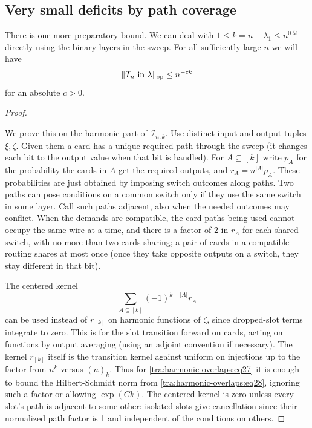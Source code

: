 \subsection{Very small deficits by path coverage}

\begin{lemma}\label{tra:harmonic-overlaps:very-sparse}

\label{tra:harmonic-overlaps:very-sparse-statement}
There is one more preparatory bound. We can deal with \(1\le k=n-\lambda_1\le n^{0.51}\) directly using the binary layers in the sweep. For all sufficiently large \(n\) we will have
\begin{equation}
                         \|T_n\text{ in }\lambda\|_{\rm op}
                                             \le n^{-c k}                 \label{tra:harmonic-overlaps:eq27}
\end{equation}
for an absolute \(c>0\).

\end{lemma}\begin{proof}\label{tra:harmonic-overlaps:very-sparse-proof}

\label{tra:harmonic-overlaps:path-coverage-forest-proof}
We prove this on the harmonic part of \(\mathcal I_{n,k}\). Use distinct input and output tuples \(\xi,\zeta\). Given them a card has a unique required path through the sweep (it changes each bit to the output value when that bit is handled). For \(A\subseteq[k]\) write \(p_A\) for the probability the cards in \(A\) get the required outputs, and \(r_A=n^{|A|}p_A\). These probabilities are just obtained by imposing switch outcomes along paths. Two paths can pose conditions on a common switch only if they use the same switch in some layer. Call such paths adjacent, also when the needed outcomes may conflict. When the demands are compatible, the card paths being used cannot occupy the same wire at a time, and there is a factor of 2 in \(r_A\) for each shared switch, with no more than two cards sharing; a pair of cards in a compatible routing shares at most once (once they take opposite outputs on a switch, they stay different in that bit).

The centered kernel
\begin{equation}
                       \sum_{A\subseteq[k]}(-1)^{k-|A|} r_A              \label{tra:harmonic-overlaps:eq28}
\end{equation}
can be used instead of \(r_{[k]}\) on harmonic functions of \(\zeta\), since dropped-slot terms integrate to zero. This is for the slot transition forward on cards, acting on functions by output averaging (using an adjoint convention if necessary). The kernel \(r_{[k]}\) itself is the transition kernel against uniform on injections up to the factor from \(n^k\) versus \((n)_k\). Thus for \eqref{tra:harmonic-overlaps:eq27} it is enough to bound the Hilbert-Schmidt norm from \eqref{tra:harmonic-overlaps:eq28}, ignoring such a factor or allowing \(\exp(Ck)\). The centered kernel is zero unless every slot's path is adjacent to some other: isolated slots give cancellation since their normalized path factor is 1 and independent of the conditions on others.


\end{proof}
